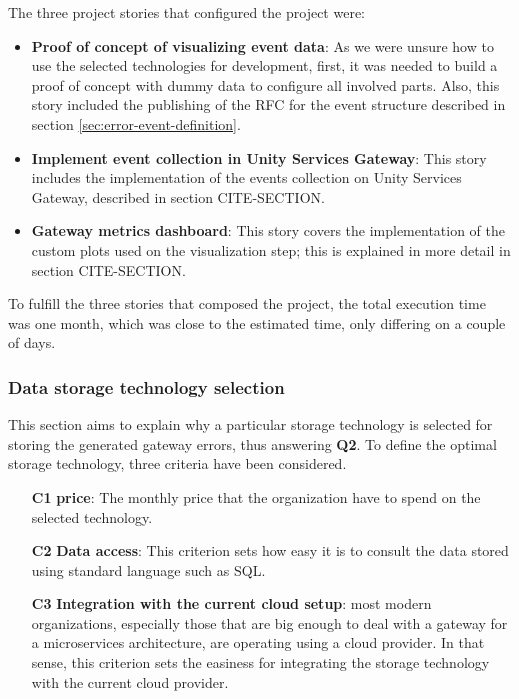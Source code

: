 \documentclass[english, 12pt, a4paper, sci, utf8, a-1b, online]{aaltothesis}
\begin{document}
The three project stories that configured the project were:

\begin{itemize}
    \item \textbf{Proof of concept of visualizing event data}: As we were unsure how to use the selected technologies for development, first, it was needed to build a proof of concept with dummy data to configure all involved parts. Also, this story included the publishing of the RFC for the event structure described in section \ref{sec:error-event-definition}.
    \item \textbf{Implement event collection in Unity Services Gateway}: This story includes the implementation of the events collection on Unity Services Gateway, described in section CITE-SECTION.
    \item \textbf{Gateway metrics dashboard}: This story covers the implementation of the custom plots used on the visualization step; this is explained in more detail in section CITE-SECTION.
\end{itemize}

To fulfill the three stories that composed the project, the total execution time was one month, which was close to the estimated time, only differing on a couple of days.

\subsubsection{Data storage technology selection}

This section aims to explain why a particular storage technology is selected for storing the generated gateway errors, thus answering \textbf{Q2}. To define the optimal storage technology, three criteria have been considered.

\begin{itemize}
    \item[\textbf{C1}] \textbf{price}: The monthly price that the organization have to spend on the selected technology.
    \item[\textbf{C2}] \textbf{Data access}: This criterion sets how easy it is to consult the data stored using standard language such as SQL.
    \item[\textbf{C3}] \textbf{Integration with the current cloud setup}: most modern organizations, especially those that are big enough to deal with a gateway for a microservices architecture, are operating using a cloud provider. In that sense, this criterion sets the easiness for integrating the storage technology with the current cloud provider.
\end{itemize}
\end{document}
